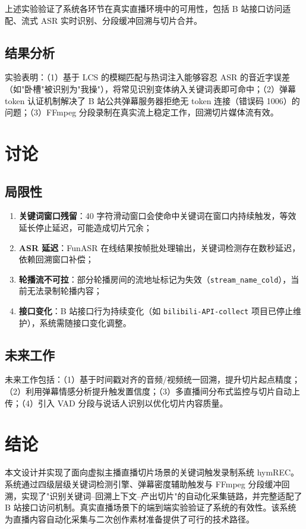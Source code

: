 \documentclass[UTF8,11pt,a4paper]{ctexart}
\begin{document}
上述实验验证了系统各环节在真实直播环境中的可用性，包括 B 站接口访问适配、流式 ASR 实时识别、分段缓冲回溯与切片合并。

\subsection{结果分析}

实验表明：（1）基于 LCS 的模糊匹配与热词注入能够容忍 ASR 的音近字误差（如"卧槽"被识别为"我操"），将常见识别变体纳入关键词表即可命中；（2）弹幕 token 认证机制解决了 B 站公共弹幕服务器拒绝无 token 连接（错误码 1006）的问题；（3）FFmpeg 分段录制在真实流上稳定工作，回溯切片媒体流有效。

\section{讨论}

\subsection{局限性}

\begin{enumerate}
\item \textbf{关键词窗口残留}：40 字符滑动窗口会使命中关键词在窗口内持续触发，等效延长停止延迟，可能造成切片冗余；
\item \textbf{ASR 延迟}：FunASR 在线结果按帧批处理输出，关键词检测存在数秒延迟，依赖回溯窗口补偿；
\item \textbf{轮播流不可拉}：部分轮播房间的流地址标记为失效（\texttt{stream\_name\_cold}），当前无法录制轮播内容；
\item \textbf{接口变化}：B 站接口行为持续变化（如 \texttt{bilibili-API-collect} 项目已停止维护），系统需随接口变化调整。
\end{enumerate}

\subsection{未来工作}

未来工作包括：（1）基于时间戳对齐的音频/视频统一回溯，提升切片起点精度；（2）利用弹幕情感分析提升触发置信度；（3）多直播间分布式监控与切片自动上传；（4）引入 VAD 分段与说话人识别以优化切片内容质量。

\section{结论}

本文设计并实现了面向虚拟主播直播切片场景的关键词触发录制系统 hymREC。系统通过四级层级关键词检测引擎、弹幕密度辅助触发与 FFmpeg 分段缓冲回溯，实现了"识别关键词--回溯上下文--产出切片"的自动化采集链路，并完整适配了 B 站接口访问机制。真实直播场景下的端到端实验验证了系统的有效性。该系统为直播内容自动化采集与二次创作素材准备提供了可行的技术路径。
\end{document}
